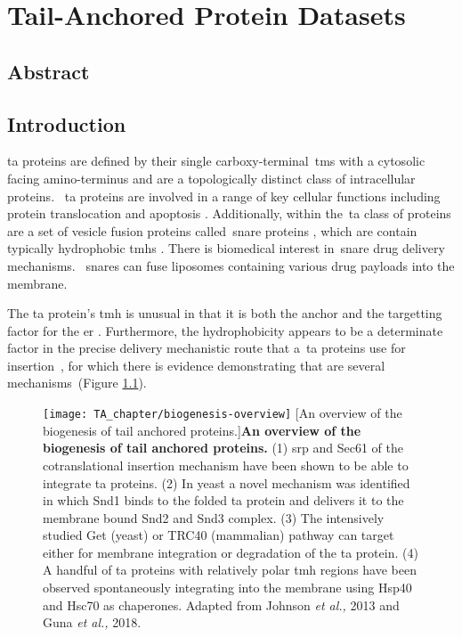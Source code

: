 \chapter{Tail-Anchored Protein Datasets}
\sloppy

\section{Abstract}

\section{Introduction}

\gls{ta} proteins are defined by their single carboxy-terminal~\gls{tms} with a cytosolic facing amino-terminus and are a topologically distinct class of intracellular proteins.
~\gls{ta} proteins are involved in a range of key cellular functions including protein translocation \cite{Osborne2005} and apoptosis \cite{Hockenbery1990}.
Additionally, within the~\gls{ta} class of proteins are a set of vesicle fusion proteins called~\gls{snare} proteins \cite{Ungar2003}, which are contain typically hydrophobic \gls{tmh}s \cite{Kalbfleisch2007}.
There is biomedical interest in~\gls{snare} drug delivery mechanisms.
~\gls{snare}s can fuse liposomes containing various drug payloads into the membrane. %

The \gls{ta} protein's \gls{tmh} is unusual in that it is both the anchor and the targetting factor for the \gls{er} \cite{Kutay1993}.
Furthermore, the hydrophobicity appears to be a determinate factor in the precise delivery mechanistic route that a~\gls{ta} proteins use for insertion~\cite{Rabu2008, Rabu2009}, for which there is evidence demonstrating that are several mechanisms~\cite{Rabu2009, Johnson2013}(Figure \ref{fig:biogenesis-overview}).


\begin{figure}[!ht]
\centering
\texttt{[image: TA\_chapter/biogenesis-overview]}
		[An overview of the biogenesis of tail anchored proteins.]{\textbf{An overview of the biogenesis of tail anchored proteins.}
		(1) \gls{srp} and Sec61 of the cotranslational insertion mechanism have been shown to be able to integrate \gls{ta} proteins.
		(2) In yeast a novel mechanism was identified in which Snd1 binds to the folded \gls{ta} protein and delivers it to the membrane bound Snd2 and Snd3 complex.
		(3) The intensively studied Get (yeast) or TRC40 (mammalian) pathway can target either for membrane integration or degradation of the \gls{ta} protein.
		(4) A handful of \gls{ta} proteins with relatively polar \gls{tmh} regions have been observed spontaneously integrating into the membrane using Hsp40 and Hsc70 as chaperones.
		Adapted from Johnson \textit{et al.,} 2013 and Guna \textit{et al.,} 2018.
}

\label{fig:biogenesis-overview}
\end{figure}

